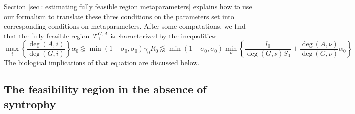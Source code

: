 \documentclass[12pt, titlepage]{report}
\begin{document}
Section \ref{sec : estimating fully feasible region metaparameters} explains how to use our formalism to translate these three conditions on the parameters set into corresponding conditions on metaparameters. After some computations, we find that the fully feasible region $\mathcal{F}^{G,A}_1$ is characterized by the inequalities:
\begin{equation}
{
\max_i\left\{\frac{\deg(A,i)}{\deg(G,i)}\right\} \alpha_0
\lessapprox \min(1-\sigma_0, \sigma_0) \gamma_0 R_0
\lessapprox
\min \left(1-\sigma_0, \sigma_0 \right) \min_\nu \left\{ \frac{l_0}{\deg(G,\nu) S_0} + \frac{\deg(A,\nu)}{\deg(G,\nu)}\alpha_0\right\}
}\label{eq : fully feasible volume}
\end{equation}
The biological implications of that equation are discussed below.

\subsection{The feasibility region in the absence of syntrophy}\label{sec : feasibility without syntrophy}
\end{document}

